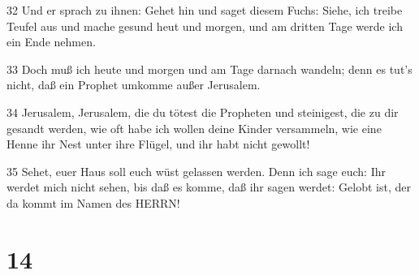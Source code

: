 \par 32 Und er sprach zu ihnen: Gehet hin und saget diesem Fuchs: Siehe, ich treibe Teufel aus und mache gesund heut und morgen, und am dritten Tage werde ich ein Ende nehmen.
\par 33 Doch muß ich heute und morgen und am Tage darnach wandeln; denn es tut's nicht, daß ein Prophet umkomme außer Jerusalem.
\par 34 Jerusalem, Jerusalem, die du tötest die Propheten und steinigest, die zu dir gesandt werden, wie oft habe ich wollen deine Kinder versammeln, wie eine Henne ihr Nest unter ihre Flügel, und ihr habt nicht gewollt!
\par 35 Sehet, euer Haus soll euch wüst gelassen werden. Denn ich sage euch: Ihr werdet mich nicht sehen, bis daß es komme, daß ihr sagen werdet: Gelobt ist, der da kommt im Namen des HERRN!

\chapter{14}

